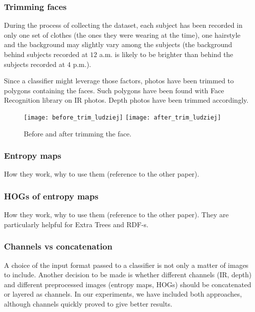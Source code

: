        \subsubsection*{Trimming faces}
        During the process of collecting the dataset, each subject has been
        recorded in only one set of clothes (the ones they were wearing at the
        time), one hairstyle and the background may slightly vary among the
        subjects (the background behind subjects recorded at $12$ a.m. is
        likely to be brighter than behind the subjects recorded at $4$ p.m.).

        Since a classifier might leverage those factors, photos have been
        trimmed to polygons containing the faces. Such polygons have been
        found with Face Recognition library \cite{facerecog} on IR photos.
        Depth photos have been trimmed accordingly.

        \begin{figure}[H]
        \caption{Before and after trimming the face.}
        \centering
        \texttt{[image: before\_trim\_ludziej]}
        \texttt{[image: after\_trim\_ludziej]}
        \end{figure}

        \subsubsection*{Entropy maps}
        How they work, why to use them (reference to the other paper).

        \subsubsection*{HOGs of entropy maps}
        How they work, why to use them (reference to the other paper). They
        are particularly helpful for Extra Trees and RDF-s.

        \subsubsection*{Channels vs concatenation}
        A choice of the input format passed to a classifier is not only a matter
        of images to include. Another decision to be made is whether different
        channels (IR, depth) and different preprocessed images (entropy maps,
        HOGs) should be concatenated or layered as channels. In our experiments,
        we have included both approaches, although channels quickly proved to
        give better results.

